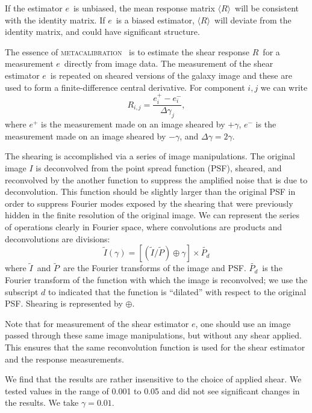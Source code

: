 \documentclass[iop, twocolappendix, appendixfloats, numberedappendix, apj]{emulateapj}
\newcommand{\vest}{\mbox{\boldmath $e$}}
\newcommand{\est}{e}
\newcommand{\mcal}{\textsc{metacalibration}}
\newcommand{\mcalR}{\mbox{\boldmath $R$}}
\newcommand{\mcalRmean}{\mbox{\boldmath $\langle R \rangle$}}
\newcommand{\Itild}{\mbox{$\widetilde{I}$}}
\newcommand{\Ptil}{\mbox{$\widetilde{P}$}}
\newcommand{\Ptild}{\mbox{$\widetilde{P_d}$}}
\begin{document}
If the estimator \vest\ is unbiased, the mean response matrix \mcalRmean\
will be consistent with the identity matrix.  If \vest\ is a biased
estimator, \mcalRmean\ will deviate from the identity matrix,
and could have significant structure.


The essence of \mcal\ \citep{HuffMcal} is to estimate the shear response
\mcalR\ for a measurement \vest\ directly from image data.  The measurement of
the shear estimator \vest\ is repeated on sheared versions of the galaxy
image and these are used to form a finite-difference central derivative.
For component $i,j$ we can write
\begin{equation} \label{eq:Rnum}
    R_{i,j} = \frac{\est_i^+ - \est_i^-}{\Delta \gamma_j},
\end{equation}
where $\est^+$ is the measurement made on an image sheared by $+\gamma$,
$\est^-$ is the measurement made on an image sheared by $-\gamma$,
and $\Delta \gamma = 2\gamma$.

The shearing is accomplished via a series of image manipulations. The original
image $I$ is deconvolved from the point spread function (PSF), sheared, and
reconvolved by the another function to suppress the amplified noise that is due to
deconvolution.  This function should be slightly larger than the original PSF
in order to suppress Fourier modes exposed by the shearing that were
previously hidden in the finite resolution of the original image.  We can
represent the series of operations clearly in Fourier space, where
convolutions are products and deconvolutions are divisions:
\begin{equation}
    \Itild(\gamma) = \left[ \left( \Itild/\Ptil \right) \oplus \gamma \right] \times \Ptild
\end{equation}
where \Itild\ and \Ptil\ are the Fourier transforms of the image and PSF.
\Ptild\ is the Fourier transform of the function with which the image
is reconvolved; we use the subscript $d$ to indicated that the function
is ``dilated'' with respect to the original PSF.
Shearing is represented by $\oplus$.

Note that for measurement of the shear estimator \vest, one should use an image
passed through these same image manipulations, but without any shear applied.
This ensures that the same reconvolution function is used for the shear
estimator and the response measurements.

We find that the results are rather insensitive to the choice of applied shear.
We tested values in the range of 0.001 to 0.05 and did not see significant
changes in the results. We take $\gamma=0.01$.
\end{document}
